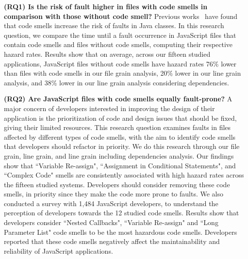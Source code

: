 \textbf{(RQ1) Is the risk of fault higher in files with code smells in comparison with those without code smell?}
Previous works~\cite{Khomh2012,jaafar2013mining} have found that code smells increase the risk of faults in Java classes. In this research question, we compare the time until a fault occurrence in JavaScript files that contain code smells and files without code smells, computing their respective hazard rates. Results show that on average, across our {\color{blue}fifteen} studied applications, JavaScript files without code smells have hazard rates {\color{blue}76\%} lower than files with code smells {\color{blue}in our file grain analysis, 20\% lower in our line grain analysis, and 38\% lower in our line grain analysis considering dependencies.}

\textbf{(RQ2) Are JavaScript files with code smells equally fault-prone?}
A major concern of developers interested in improving the design of their application is the prioritization of code and design issues that should be fixed, giving their limited resources. This research question examines faults in files affected by different types of code smells, with the aim to identify code smells that developers should refactor in priority. {\color{blue}We do this research through our file grain, line grain, and line grain including dependencies analysis.} Our findings show that ``Variable Re-assign", ``Assignment in Conditional Statements", {\color{blue}and ``Complex Code"} smells are consistently associated with high hazard rates across the {\color{blue}fifteen} studied systems. Developers should consider removing these code smells, in priority since they make the code more prone to faults. 
We also conducted a survey with 1,484 JavaScript developers, to understand the perception of developers towards the 12 studied code smells. Results show that developers consider ``Nested Callbacks", ``Variable Re-assign" and ``Long Parameter List" code smells to be the most hazardous code smells. Developers reported that these code smells negatively affect the maintainability and reliability of JavaScript applications.

